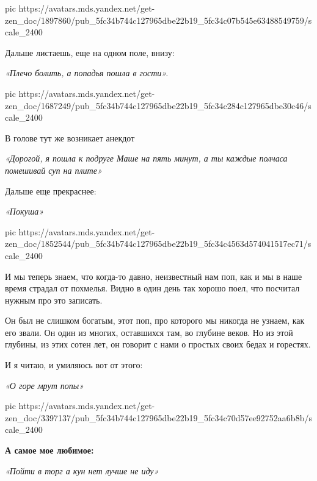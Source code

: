 \ifcmt
pic https://avatars.mds.yandex.net/get-zen_doc/1897860/pub_5fc34b744c127965dbe22b19_5fc34c07b545e63488549759/scale_2400
\fi

Дальше листаешь, еще на одном поле, внизу:

\begin{leftbar}
	\begingroup
		\em «Плечо болить, а попадья пошла в гости».
	\endgroup
\end{leftbar}

\ifcmt
pic https://avatars.mds.yandex.net/get-zen_doc/1687249/pub_5fc34b744c127965dbe22b19_5fc34c284c127965dbe30c46/scale_2400
\fi

В голове тут же возникает анекдот

\begin{leftbar}
	\begingroup
		\em «Дорогой, я пошла к подруге Маше на пять минут, а ты каждые полчаса помешивай суп на плите»
	\endgroup
\end{leftbar}

Дальше еще прекраснее:

\begin{leftbar}
	\begingroup
		\em «Покуша»
	\endgroup
\end{leftbar}

\ifcmt
pic https://avatars.mds.yandex.net/get-zen_doc/1852544/pub_5fc34b744c127965dbe22b19_5fc34c4563d574041517ec71/scale_2400
\fi

И мы теперь знаем, что когда-то давно, неизвестный нам поп, как и мы в наше
время страдал от похмелья. Видно в один день так хорошо поел, что посчитал
нужным про это записать.

Он был не слишком богатым, этот поп, про которого мы никогда не узнаем, как его
звали. Он один из многих, оставшихся там, во глубине веков. Но из этой глубины,
из этих сотен лет, он говорит с нами о простых своих бедах и горестях.

И я читаю, и умиляюсь вот от этого:

\begin{leftbar}
	\begingroup
		\em «О горе мрут попы»
	\endgroup
\end{leftbar}

\ifcmt
pic https://avatars.mds.yandex.net/get-zen_doc/3397137/pub_5fc34b744c127965dbe22b19_5fc34c70d57ee92752aa6b8b/scale_2400
\fi

\textbf{А самое мое любимое:}

\begin{leftbar}
	\begingroup
		\em «Пойти в торг а кун нет лучше не иду»
	\endgroup
\end{leftbar}

